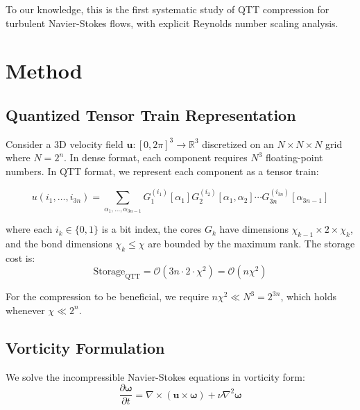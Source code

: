 \documentclass[11pt,a4paper]{article}
\newcommand{\bigO}{\mathcal{O}}
\newcommand{\R}{\mathbb{R}}
\theoremstyle{definition}
\begin{document}
To our knowledge, this is the first systematic study of QTT compression for turbulent Navier-Stokes flows, with explicit Reynolds number scaling analysis.

\section{Method}
\label{sec:method}

\subsection{Quantized Tensor Train Representation}

Consider a 3D velocity field $\mathbf{u}: [0, 2\pi]^3 \to \R^3$ discretized on an $N \times N \times N$ grid where $N = 2^n$.
In dense format, each component requires $N^3$ floating-point numbers.
In QTT format, we represent each component as a tensor train:

\begin{equation}
u(i_1, \ldots, i_{3n}) = \sum_{\alpha_1, \ldots, \alpha_{3n-1}} G_1^{(i_1)}[\alpha_1] G_2^{(i_2)}[\alpha_1, \alpha_2] \cdots G_{3n}^{(i_{3n})}[\alpha_{3n-1}]
\end{equation}

where each $i_k \in \{0, 1\}$ is a bit index, the cores $G_k$ have dimensions $\chi_{k-1} \times 2 \times \chi_k$, and the bond dimensions $\chi_k \leq \chi$ are bounded by the maximum rank.
The storage cost is:
\begin{equation}
\text{Storage}_{\text{QTT}} = \bigO(3n \cdot 2 \cdot \chi^2) = \bigO(n \chi^2)
\end{equation}

For the compression to be beneficial, we require $n\chi^2 \ll N^3 = 2^{3n}$, which holds whenever $\chi \ll 2^{n}$.

\subsection{Vorticity Formulation}

We solve the incompressible Navier-Stokes equations in vorticity form:
\begin{equation}
\frac{\partial \boldsymbol{\omega}}{\partial t} = \nabla \times (\mathbf{u} \times \boldsymbol{\omega}) + \nu \nabla^2 \boldsymbol{\omega}
\label{eq:vorticity}
\end{equation}
\end{document}
